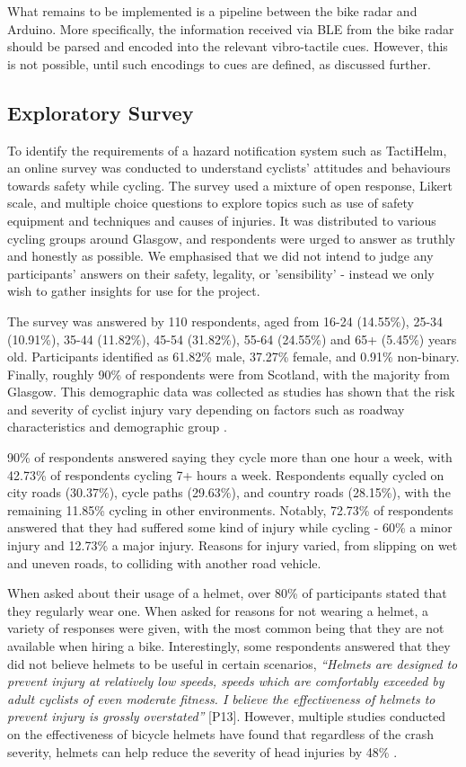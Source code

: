 \documentclass{interim}
\begin{document}
What remains to be implemented is a pipeline between the bike radar and Arduino. More specifically, the information received via BLE from the bike radar should be parsed and encoded into the relevant vibro-tactile cues. However, this is not possible, until such encodings to cues are defined, as discussed further.


\subsection{Exploratory Survey}\label{sec:survey}
To identify the requirements of a hazard notification system such as TactiHelm, an online survey was conducted to understand cyclists' attitudes and behaviours towards safety while cycling. The survey used a mixture of open response, Likert scale, and multiple choice questions to explore topics such as use of safety equipment and techniques and causes of injuries. It was distributed to various cycling groups around Glasgow, and respondents were urged to answer as truthly and honestly as possible. We emphasised that we did not intend to judge any participants' answers on their safety, legality, or 'sensibility' - instead we only wish to gather insights for use for the project.

The survey was answered by 110 respondents, aged from 16-24 (14.55\%), 25-34 (10.91\%), 35-44 (11.82\%), 45-54 (31.82\%), 55-64 (24.55\%) and 65+ (5.45\%) years old. Participants identified as 61.82\% male, 37.27\% female, and 0.91\% non-binary. Finally, roughly 90\% of respondents were from Scotland, with the majority from Glasgow. This demographic data was collected as studies has shown that the risk and severity of cyclist injury vary depending on factors such as roadway characteristics and demographic group \cite{BEHNOOD201735}.

90\% of respondents answered saying they cycle more than one hour a week, with 42.73\% of respondents cycling 7+ hours a week. Respondents equally cycled on city roads (30.37\%), cycle paths (29.63\%), and country roads (28.15\%), with the remaining 11.85\% cycling in other environments. Notably, 72.73\% of respondents answered that they had suffered some kind of injury while cycling - 60\% a minor injury and 12.73\% a major injury. Reasons for injury varied, from slipping on wet and uneven roads, to colliding with another road vehicle.

When asked about their usage of a helmet, over 80\% of participants stated that they regularly wear one. When asked for reasons for not wearing a helmet, a variety of responses were given, with the most common being that they are not available when hiring a bike. Interestingly, some respondents answered that they did not believe helmets to be useful in certain scenarios, \textit{“Helmets are designed to prevent injury at relatively low speeds, speeds which are comfortably exceeded by adult cyclists of even moderate fitness. I believe the effectiveness of helmets to prevent injury is grossly overstated”} [P13]. However, multiple studies conducted on the effectiveness of bicycle helmets \cite{10.1093/ije/dyw153, HOYE201885, HOYE2018239, buth2023effectiveness} have found that regardless of the crash severity, helmets can help reduce the severity of head injuries by 48\% \cite{HOYE201885}.
\end{document}
